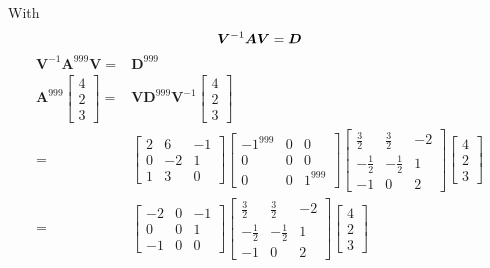 \documentclass[12pt]{article}
\newcommand{\matr}[1]{\bm{#1}}
\begin{document}
With
\begin{equation}
	\matr V^{-1} \matr A \matr V = \matr D \\
\end{equation}
\begin{align}
	\matr V ^{-1} \matr A ^ {999} \matr V =& \matr D^{999} \\
	\matr A ^ {999} \begin{bmatrix}4\\2\\3\end{bmatrix}=& \matr V \matr D ^ {999} \matr V ^ {-1}\begin{bmatrix}4\\2\\3\end{bmatrix} \\
	= & \left[\begin{matrix}2  & 6  & -1 \\0 & -2 & 1\\1 & 3 & 0\end{matrix}\right]
	\left[\begin{matrix}-1^{999} & 0 & 0\\0 & 0 & 0\\0 & 0 & 1^{999}\end{matrix}\right]
	\left[\begin{matrix}\frac{3}{2} & \frac{3}{2} & -2\\- \frac{1}{2} & - \frac{1}{2} & 1\\-1 & 0 & 2\end{matrix}\right]
	\left[\begin{matrix}4\\2\\3\end{matrix}\right] \\
	= & \left[\begin{matrix}-2 & 0  & -1 \\0 & 0 & 1\\-1 & 0 & 0\end{matrix}\right]
	\left[\begin{matrix}\frac{3}{2} & \frac{3}{2} & -2\\- \frac{1}{2} & - \frac{1}{2} & 1\\-1 & 0 & 2\end{matrix}\right]
	\left[\begin{matrix}4\\2\\3\end{matrix}\right] \\

\end{align}
\end{document}
